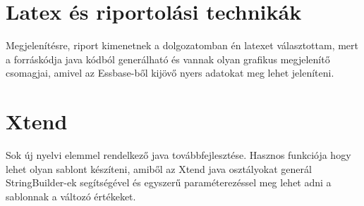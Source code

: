 \section{Latex és riportolási technikák}
Megjelenítésre, riport kimenetnek a dolgozatomban én latexet választottam, mert
a forráskódja java kódból generálható és vannak olyan grafikus megjelenítő
csomagjai, amivel az Essbase-ből kijövő nyers adatokat meg lehet jeleníteni.

\section{Xtend}
Sok új nyelvi elemmel rendelkező java továbbfejlesztése. Hasznos funkciója hogy
lehet olyan sablont készíteni, amiből az Xtend java osztályokat generál
StringBuilder-ek segítségével és egyszerű paraméterezéssel meg lehet adni a
sablonnak a változó értékeket.

